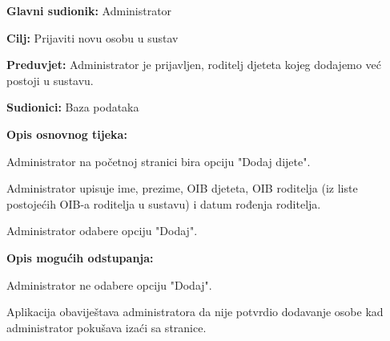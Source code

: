 					\noindent {}
					\begin{packed_item}
						
						\item \textbf{Glavni sudionik: }Administrator
						\item  \textbf{Cilj:} Prijaviti novu osobu u sustav
						\item  \textbf{Preduvjet:} Administrator je prijavljen, roditelj djeteta kojeg dodajemo već postoji u sustavu.
						\item  \textbf{Sudionici:} Baza podataka
						\item  \textbf{Opis osnovnog tijeka:}
						
						\item[] \begin{packed_enum}
							
							\item Administrator na početnoj stranici bira opciju "Dodaj dijete".
							\item Administrator upisuje ime, prezime, OIB djeteta, OIB roditelja (iz liste postojećih OIB-a roditelja u sustavu) i datum rođenja roditelja.
							\item Administrator odabere opciju "Dodaj".
						\end{packed_enum}
						
						\item  \textbf{Opis mogućih odstupanja:}
						
						\item[] \begin{packed_item}
							
							
							\item[3.a] Administrator ne odabere opciju "Dodaj".
							\item[] \begin{packed_enum}
								
								\item Aplikacija obaviještava administratora da nije potvrdio dodavanje osobe kad administrator pokušava izaći sa stranice.
							\end{packed_enum}
							
							
						\end{packed_item}
						
						
					\end{packed_item}
					
